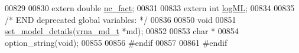 \begin{DoxyCode}
00829 
00830 \textcolor{keyword}{extern} \textcolor{keywordtype}{double} \hyperlink{group__consensus__fold_ga502948a122a2af5b914355b1f3ea2f61}{nc\_fact};
00831 
00833 \textcolor{keyword}{extern}  \textcolor{keywordtype}{int} \hyperlink{group__model__details_ga80c3c5fd35e7479704cc91d2d0367743}{logML};
00834 
00835 \textcolor{comment}{/* END deprecated global variables: */}
00836 
00850 \textcolor{keywordtype}{void}
00851 \hyperlink{group__model__details_gabad896c3650d420f3f3ddefc69e2bceb}{set\_model\_details}(\hyperlink{group__model__details_structvrna__md__s}{vrna\_md\_t} *md);
00852 
00853 \textcolor{keywordtype}{char} *
00854 option\_string(\textcolor{keywordtype}{void});
00855 
00856 \textcolor{preprocessor}{#endif}
00857 
00861 \textcolor{preprocessor}{#endif}
\end{DoxyCode}
